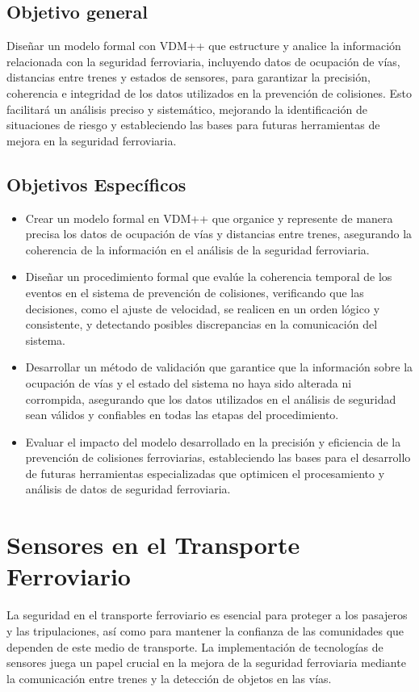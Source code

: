 \documentclass[journal]{IEEEtran}
\begin{document}
\subsection{Objetivo general}  
Diseñar un modelo formal con VDM++ que estructure y analice la información relacionada con la seguridad ferroviaria, incluyendo datos de ocupación de vías, distancias entre trenes y estados de sensores, para garantizar la precisión, coherencia e integridad de los datos utilizados en la prevención de colisiones. Esto facilitará un análisis preciso y sistemático, mejorando la identificación de situaciones de riesgo y estableciendo las bases para futuras herramientas de mejora en la seguridad ferroviaria.  

\subsection{Objetivos Específicos}  

\begin{itemize}  
    \item Crear un modelo formal en VDM++ que organice y represente de manera precisa los datos de ocupación de vías y distancias entre trenes, asegurando la coherencia de la información en el análisis de la seguridad ferroviaria.  

    \item Diseñar un procedimiento formal que evalúe la coherencia temporal de los eventos en el sistema de prevención de colisiones, verificando que las decisiones, como el ajuste de velocidad, se realicen en un orden lógico y consistente, y detectando posibles discrepancias en la comunicación del sistema.  

    \item Desarrollar un método de validación que garantice que la información sobre la ocupación de vías y el estado del sistema no haya sido alterada ni corrompida, asegurando que los datos utilizados en el análisis de seguridad sean válidos y confiables en todas las etapas del procedimiento.  

    \item Evaluar el impacto del modelo desarrollado en la precisión y eficiencia de la prevención de colisiones ferroviarias, estableciendo las bases para el desarrollo de futuras herramientas especializadas que optimicen el procesamiento y análisis de datos de seguridad ferroviaria.  
\end{itemize}  

\section{Sensores en el Transporte Ferroviario}
La seguridad en el transporte ferroviario es esencial para proteger a los pasajeros y las tripulaciones, así como para mantener la confianza de las comunidades que dependen de este medio de transporte. La implementación de tecnologías de sensores juega un papel crucial en la mejora de la seguridad ferroviaria mediante la comunicación entre trenes y la detección de objetos en las vías.  
\end{document}
